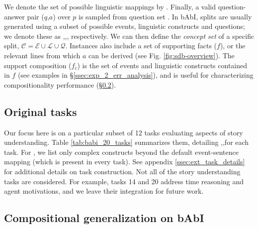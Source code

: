 We denote the set of possible linguistic mappings by \lingset. Finally, a valid question-answer pair ($q$,$a$) over $p$ is sampled from question set \questionset. In bAbI, splits are usually generated using a subset of possible events, linguistic constructs and questions; we denote these as \posseventset,\posslingset,\possquestionset, respectively. We can then define the \emph{concept set} of a specific split,  $\mathcal{C}=\mathcal{E}\cup\mathcal{L}\cup\mathcal{Q}$.
Instances also include a set of supporting facts ($f$), or the relevant lines from which $a$ can be derived (see Fig. \ref{fig:sdb-overview}). The support composition ($f_{c}$) is the set of events and linguistic constructs contained in $f$ (see examples in \S\ref{ssec:exp_2_err_analysis}), and is useful for characterizing compositionality performance (\S\ref{ssec:comp_gen_motivation}).


\subsection{Original \babibm tasks}



Our focus here is on a particular subset of 12 \babibm tasks evaluating aspects of story understanding. Table \ref{tab:babi_20_tasks} summarizes them, detailing \posseventset,\posslingset,\possquestionset for each task. For \posslingset, we list only complex constructs beyond the default event-sentence mapping (which is present in every task). See appendix \ref{ssec:ext_task_details} for additional details on task construction. Not all of the story understanding tasks are considered. For example, tasks 14 and 20 address time reasoning and agent motivations, and we leave their integration for future work. 





\subsection{Compositional generalization on bAbI}
\label{ssec:comp_gen_motivation}

